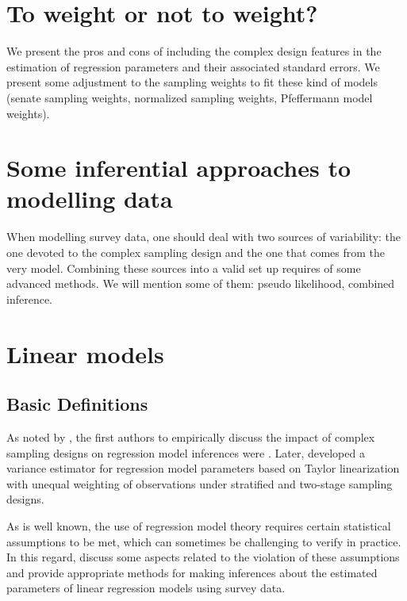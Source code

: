 \documentclass[
  12pt,
]{book}
\begin{document}
\section{To weight or not to weight?}\label{to-weight-or-not-to-weight}

We present the pros and cons of including the complex design features in the estimation of regression parameters and their associated standard errors. We present some adjustment to the sampling weights to fit these kind of models (senate sampling weights, normalized sampling weights, Pfeffermann model weights).

\section{Some inferential approaches to modelling data}\label{some-inferential-approaches-to-modelling-data}

When modelling survey data, one should deal with two sources of variability: the one devoted to the complex sampling design and the one that comes from the very model. Combining these sources into a valid set up requires of some advanced methods. We will mention some of them: pseudo likelihood, combined inference.

\section{Linear models}\label{linear-models}

\subsection{Basic Definitions}\label{basic-definitions}

As noted by \citet{Heeringa_West_Berglund_2017}, the first authors to empirically discuss the impact of complex sampling designs on regression model inferences were \citet{kish1974inference}. Later, \citet{fuller1975regression} developed a variance estimator for regression model parameters based on Taylor linearization with unequal weighting of observations under stratified and two-stage sampling designs.

As is well known, the use of regression model theory requires certain statistical assumptions to be met, which can sometimes be challenging to verify in practice. In this regard, \citet{shah1977inference} discuss some aspects related to the violation of these assumptions and provide appropriate methods for making inferences about the estimated parameters of linear regression models using survey data.
\end{document}
